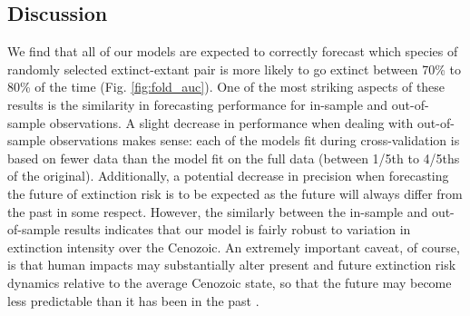 \documentclass[12pt,letterpaper]{article}
\begin{document}
\begin{refsection}
%
%
%



\section{Discussion}

We find that all of our models are expected to correctly forecast which species of randomly selected extinct-extant pair is more likely to go extinct between 70\% to 80\% of the time (Fig. \ref{fig:fold_auc}). One of the most striking aspects of these results is the similarity in forecasting performance for in-sample and out-of-sample observations. A slight decrease in performance when dealing with out-of-sample observations makes sense: each of the models fit during cross-validation is based on fewer data than the model fit on the full data (between 1/5th to 4/5ths of the original). Additionally, a potential decrease in precision when forecasting the future of extinction risk is to be expected as the future will always differ from the past in some respect. However, the similarly between the in-sample and out-of-sample results indicates that our model is fairly robust to variation in extinction intensity over the Cenozoic. An extremely important caveat, of course, is that human impacts may substantially alter present and future extinction risk dynamics relative to the average Cenozoic state, so that the future may become less predictable than it has been in the past \citep{Harnik2012a,Finnegan2015}.


\end{refsection}
\end{document}

